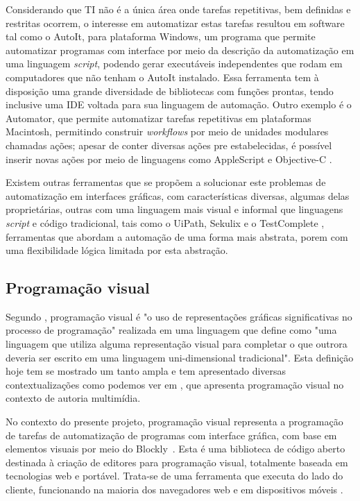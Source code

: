 \documentclass[tg]{mdtufsm}
\begin{document}
	Considerando que TI não é a única área onde tarefas repetitivas, bem definidas e restritas ocorrem, o interesse em automatizar estas tarefas resultou em software tal como o AutoIt\cite{autoit}, para plataforma Windows, um programa que permite automatizar programas com interface por meio da descrição da automatização em uma linguagem \emph{script}, podendo gerar executáveis independentes que rodam em computadores que não tenham o AutoIt instalado. Essa ferramenta tem à disposição uma grande diversidade de bibliotecas com funções prontas, tendo inclusive uma IDE voltada para sua linguagem de automação. Outro exemplo é o Automator, que permite automatizar tarefas repetitivas em plataformas Macintosh, permitindo construir \emph{workflows} por meio de unidades modulares chamadas ações; apesar de conter diversas ações pre estabelecidas, é possível inserir novas ações por meio de linguagens como AppleScript e Objective-C \cite{automator}.
	
	Existem outras ferramentas que se propõem a solucionar este problemas de automatização em interfaces gráficas, com características diversas, algumas delas proprietárias, outras com uma linguagem mais visual e informal que linguagens \emph{script} e código tradicional, tais como o UiPath, Sekulix e o TestComplete \cite{uipath,testcomplete,sikuli}, ferramentas que abordam a automação de uma forma mais abstrata, porem com uma flexibilidade lógica limitada por esta abstração. 
	

	\subsection{Programação visual}
	
	Segundo \citeauthor{visualProgram}\cite{visualProgram}, programação visual é "o uso de representações gráficas significativas no processo de programação" realizada em uma linguagem que \citeauthor{visualProgram} define como "uma linguagem que utiliza alguma representação visual para completar o que outrora deveria ser escrito em uma linguagem uni-dimensional tradicional". Esta definição hoje tem se mostrado um tanto ampla e tem apresentado diversas contextualizações como podemos ver em \cite{visualProgAuth}, que apresenta programação visual no contexto de autoria multimídia.
	
	No contexto do presente projeto, programação visual representa a programação de tarefas de automatização de programas com interface gráfica, com base em elementos visuais por meio do Blockly~\cite{blockly}. Esta é uma biblioteca de código aberto destinada à criação de editores para programação visual, totalmente baseada em tecnologias web e portável. Trata-se de uma ferramenta que executa do lado do cliente, funcionando na maioria dos navegadores web e em dispositivos móveis \cite{blockly}.
	
\end{document}
